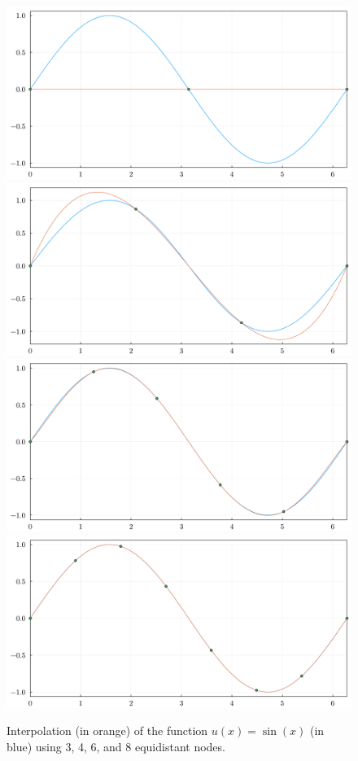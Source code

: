 \begin{figure}[ht!]
    \centering
    \includegraphics[width=0.49\linewidth]{figures/interpolation_sine_3.pdf}
    \includegraphics[width=0.49\linewidth]{figures/interpolation_sine_4.pdf}
    \includegraphics[width=0.49\linewidth]{figures/interpolation_sine_6.pdf}
    \includegraphics[width=0.49\linewidth]{figures/interpolation_sine_8.pdf}
    \caption{Interpolation (in orange) of the function $u(x) = \sin(x)$ (in blue) using 3, 4, 6, and 8 equidistant nodes.}%
    \label{fig:interpolation_sine}
\end{figure}

